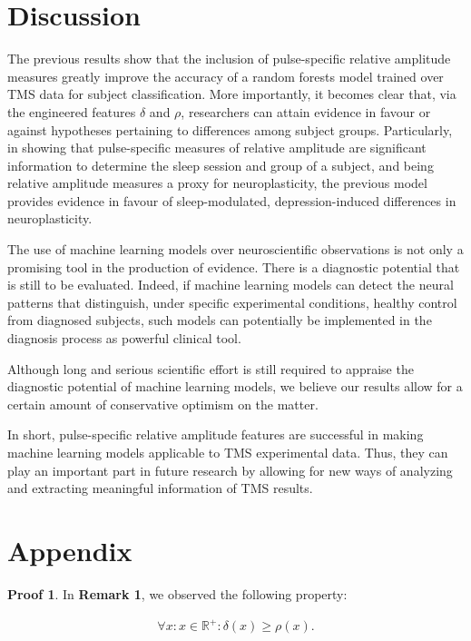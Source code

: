 \documentclass{article}
\begin{document}
\justifying
\begin{multicols}{2}

\section{Discussion}

The previous results show that the inclusion of pulse-specific relative
amplitude measures greatly improve the accuracy of a random forests model
trained over TMS data for subject classification. More importantly, it becomes
clear that, via the engineered features $\delta$ and $\rho$, researchers can
attain evidence in favour or against hypotheses pertaining to differences among
subject groups. Particularly, in showing that pulse-specific measures of
relative amplitude are significant information to determine the sleep session
and group of a subject, and being relative amplitude measures a proxy for
neuroplasticity, the previous model provides evidence in favour of
sleep-modulated, depression-induced differences in neuroplasticity.

The use of machine learning models over neuroscientific observations is not only
a promising tool in the production of evidence. There is a diagnostic potential
that is still to be evaluated. Indeed, if machine learning models can detect the
neural patterns that distinguish, under specific experimental conditions,
healthy control from diagnosed subjects, such models can potentially be
implemented in the diagnosis process as powerful clinical tool. 

Although long and serious scientific effort is still required to appraise the
diagnostic potential of machine learning models, we believe our results allow
for a certain amount of conservative optimism on the matter.

In short, pulse-specific relative amplitude features are successful in making
machine learning models applicable to TMS experimental data. Thus, they can play
an important part in future research by allowing for new ways of analyzing and
extracting meaningful information of TMS results.

\section{Appendix}

\textbf{Proof 1}. In \textbf{Remark 1}, we observed the following property:

    \begin{align*}
        \forall x: x \in \mathbb{R}^+ : \delta(x) \geq \rho(x)
    .\end{align*}


\end{multicols}
\end{document}
